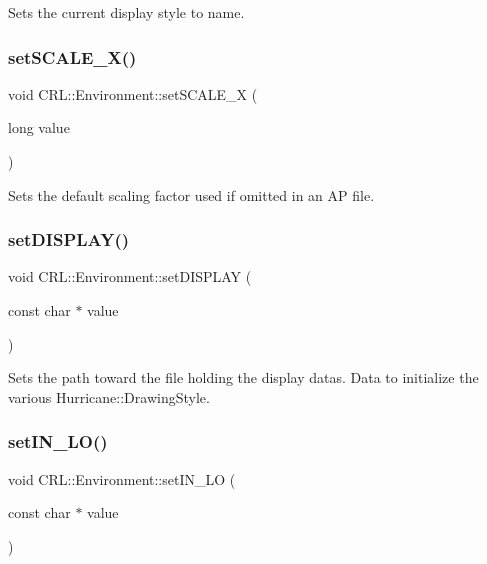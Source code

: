 Sets the current display style to {\ttfamily name}. \mbox{\label{classCRL_1_1Environment_ad14d519b0a4c964d7a786739499571dd}} 
\subsubsection{\texorpdfstring{set\+S\+C\+A\+L\+E\+\_\+\+X()}{setSCALE\_X()}}
{\footnotesize\ttfamily void C\+R\+L\+::\+Environment\+::set\+S\+C\+A\+L\+E\+\_\+X (\begin{DoxyParamCaption}\item[{long}]{value }\end{DoxyParamCaption})\hspace{0.3cm}{\ttfamily [inline]}}

Sets the default scaling factor used if omitted in an AP file. \mbox{\label{classCRL_1_1Environment_a69416219076a00900f58d0d5e0ac55a9}} 
\subsubsection{\texorpdfstring{set\+D\+I\+S\+P\+L\+A\+Y()}{setDISPLAY()}}
{\footnotesize\ttfamily void C\+R\+L\+::\+Environment\+::set\+D\+I\+S\+P\+L\+AY (\begin{DoxyParamCaption}\item[{const char $\ast$}]{value }\end{DoxyParamCaption})\hspace{0.3cm}{\ttfamily [inline]}}

Sets the path toward the file holding the display datas. Data to initialize the various Hurricane\+::\+Drawing\+Style. \mbox{\label{classCRL_1_1Environment_ad204e8f425d3a35bba494a60d4b4ff69}} 
\subsubsection{\texorpdfstring{set\+I\+N\+\_\+\+L\+O()}{setIN\_LO()}}
{\footnotesize\ttfamily void C\+R\+L\+::\+Environment\+::set\+I\+N\+\_\+\+LO (\begin{DoxyParamCaption}\item[{const char $\ast$}]{value }\end{DoxyParamCaption})\hspace{0.3cm}{\ttfamily [inline]}}

